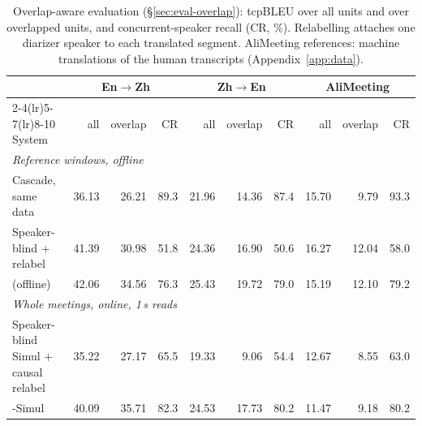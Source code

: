 \begin{table}[t]
\centering\small
\setlength{\tabcolsep}{4pt}
\begin{tabular}{lrrrrrrrrr}
\toprule
 & \multicolumn{3}{c}{En$\rightarrow$Zh} & \multicolumn{3}{c}{Zh$\rightarrow$En} & \multicolumn{3}{c}{AliMeeting} \\
\cmidrule(lr){2-4}\cmidrule(lr){5-7}\cmidrule(lr){8-10}
System & all & overlap & CR & all & overlap & CR & all & overlap & CR \\
\midrule
\multicolumn{10}{l}{\emph{Reference windows, offline}} \\
Cascade, same data & 36.13 & 26.21 & 89.3 & 21.96 & 14.36 & 87.4 & 15.70 & 9.79 & 93.3 \\
Speaker-blind + relabel & 41.39 & 30.98 & 51.8 & 24.36 & 16.90 & 50.6 & 16.27 & 12.04 & 58.0 \\
\sys{} (offline) & 42.06 & 34.56 & 76.3 & 25.43 & 19.72 & 79.0 & 15.19 & 12.10 & 79.2 \\
\multicolumn{10}{l}{\emph{Whole meetings, online, 1\,s reads}} \\
Speaker-blind Simul + causal relabel & 35.22 & 27.17 & 65.5 & 19.33 & 9.06 & 54.4 & 12.67 & 8.55 & 63.0 \\
\sys{}-Simul & 40.09 & 35.71 & 82.3 & 24.53 & 17.73 & 80.2 & 11.47 & 9.18 & 80.2 \\
\bottomrule
\end{tabular}
\caption{Overlap-aware evaluation (\S\ref{sec:eval-overlap}): tcpBLEU over all units and over overlapped units, and
concurrent-speaker recall (CR, \%). Relabelling attaches one diarizer speaker to each translated segment. AliMeeting references: machine translations of the human transcripts (Appendix~\ref{app:data}).}
\label{tab:ovmain8}
\end{table}
